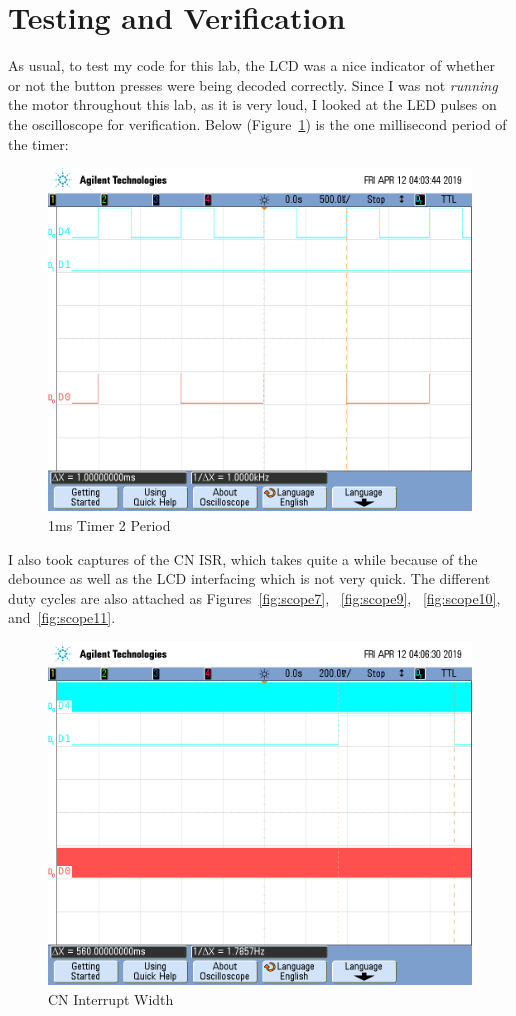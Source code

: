 \documentclass[a4paper, 12pt]{article}
\begin{document}
\section{Testing and Verification}
As usual, to test my code for this lab, the LCD was a nice indicator of whether or not the button presses were being decoded correctly. Since I was not \textit{running} the motor throughout this lab, as it is very loud, I looked at the LED pulses on the oscilloscope for verification. Below (Figure~\ref{fig:scope6}) is the one millisecond period of the timer:

\begin{figure}[H]
\centering
\includegraphics[width=.8\textwidth]{scope_6.png}
\caption{1ms Timer 2 Period}
\label{fig:scope6}
\end{figure}

I also took captures of the CN ISR, which takes quite a while because of the debounce as well as the LCD interfacing which is not very quick. The different duty cycles are also attached as Figures~\ref{fig:scope7}, ~\ref{fig:scope9}, ~\ref{fig:scope10}, and~\ref{fig:scope11}.

\begin{figure}[H]
\centering
\includegraphics[width=.8\textwidth]{scope_8.png}
\caption{CN Interrupt Width}
\label{fig:scope8}
\end{figure}
\end{document}

